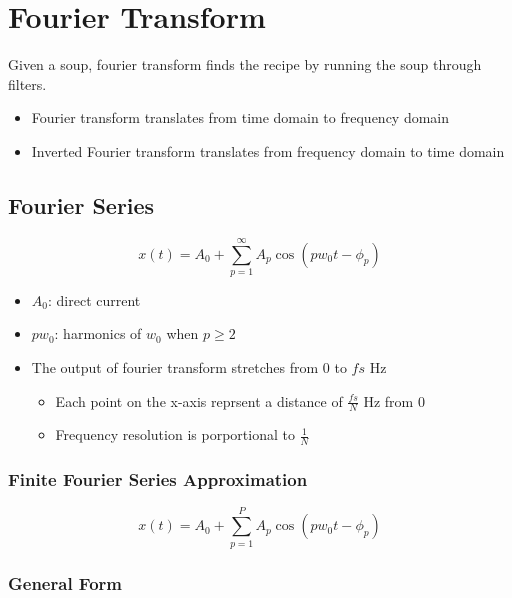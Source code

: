 \chapter{Fourier Transform}
\label{sec: fourier transform}

Given a soup, fourier transform finds the recipe by running the soup through
filters.

\begin{itemize}
  \item Fourier transform translates from time domain to frequency domain
  \item Inverted Fourier transform translates from frequency domain to time
  domain
\end{itemize}

\section{Fourier Series}

  \begin{equation}
    x\left( t \right) = A_{0}
      + \sum_{p = 1}^{\infty} A_{p} \cos\left( p w_{0} t - \phi_{p} \right)
  \end{equation}

  \begin{itemize}
    \item $ A_{0} $: direct current
    \item $ p w_{0} $: harmonics of $ w_{0} $ when $ p \ge 2 $
    \item The output of fourier transform stretches from 0 to $ fs $ Hz
    \begin{itemize}
      \item Each point on the x-axis reprsent a distance of $ \frac{fs}{N} $ Hz
      from $ 0 $
      \item Frequency resolution is porportional to $ \frac{1}{N} $
    \end{itemize}
  \end{itemize}

  \subsection{Finite Fourier Series Approximation}

    \begin{equation}
      x\left( t \right) = A_{0}
        + \sum_{p = 1}^{P} A_{p} \cos\left( p w_{0} t - \phi_{p} \right)
    \end{equation}

  \subsection{General Form}

